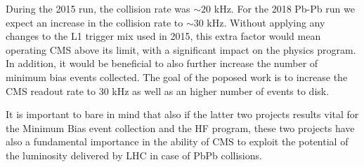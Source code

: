 During the 2015 run, the collision rate was $\sim 20$ kHz. For the 2018 Pb-Pb run we expect an increase in the collision
rate to $\sim 30$ kHz. Without applying any changes to the L1 trigger mix used in 2015, this extra factor would mean
operating CMS above its limit, with a significant impact on the physics program. In addition, it would be beneficial to also further increase the number of minimum bias events collected.
The goal of the poposed work is to increase the CMS readout rate to 30 kHz as well as an higher number of events to disk.

It is important to bare in mind that also if the latter two projects results vital for the Minimum Bias event collection and the HF program, these two projects have also a fundamental importance in the ability of CMS to exploit the potential of the luminosity delivered by LHC in case of PbPb collisions. 